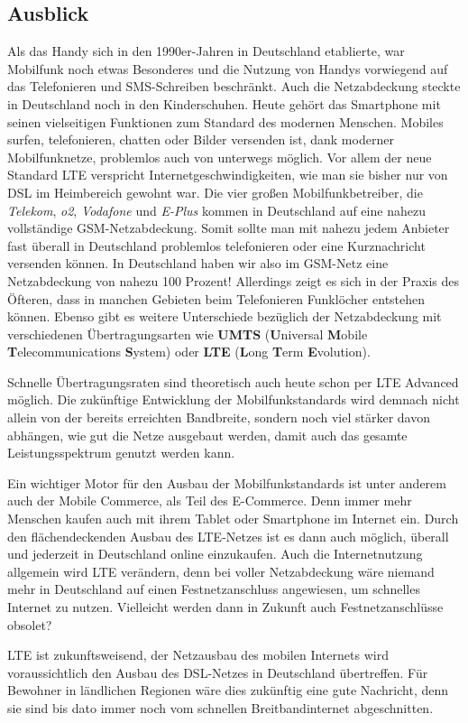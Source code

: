 \begin{multicols}{3}
\subsection*{Ausblick}
Als das Handy sich in den 1990er-Jahren in Deutschland etablierte, war Mobilfunk noch etwas Besonderes und die Nutzung von Handys vorwiegend auf das Telefonieren und SMS-Schreiben beschränkt. Auch die Netzabdeckung steckte in Deutschland noch in den Kinderschuhen. Heute gehört das Smartphone mit seinen vielseitigen Funktionen zum Standard des modernen Menschen. Mobiles surfen, telefonieren, chatten oder Bilder versenden ist, dank moderner Mobilfunknetze, problemlos auch von unterwegs möglich. Vor allem der neue Standard LTE verspricht Internetgeschwindigkeiten, wie man sie bisher nur von DSL im Heimbereich gewohnt war.
Die vier großen Mobilfunkbetreiber, die \textit{Telekom}, \textit{o2}, \textit{Vodafone} und \textit{E-Plus} kommen in Deutschland auf eine nahezu vollständige GSM-Netzabdeckung. Somit sollte man mit nahezu jedem Anbieter fast überall in Deutschland problemlos telefonieren oder eine Kurznachricht versenden können. In Deutschland haben wir also im GSM-Netz eine Netzabdeckung von nahezu 100 Prozent! Allerdings zeigt es sich in der Praxis des Öfteren, dass in manchen Gebieten beim Telefonieren Funklöcher entstehen können. Ebenso gibt es weitere Unterschiede bezüglich der Netzabdeckung mit verschiedenen Übertragungsarten wie \textbf{UMTS} (\textbf{U}niversal \textbf{M}obile \textbf{T}elecommunications \textbf{S}ystem) oder \textbf{LTE} (\textbf{L}ong \textbf{T}erm \textbf{E}volution).

Schnelle Übertragungsraten sind theoretisch auch heute schon per LTE Advanced möglich. Die zukünftige Entwicklung der Mobilfunkstandards wird demnach nicht allein von der bereits erreichten Bandbreite, sondern noch viel stärker davon abhängen, wie gut die Netze ausgebaut werden, damit auch das gesamte Leistungsspektrum genutzt werden kann.

Ein wichtiger Motor für den Ausbau der Mobilfunkstandards ist unter anderem auch der Mobile Commerce, als Teil des E-Commerce. Denn immer mehr Menschen kaufen auch mit ihrem Tablet oder Smartphone im Internet ein. Durch den flächendeckenden Ausbau des LTE-Netzes ist es dann auch möglich, überall und jederzeit in Deutschland online einzukaufen. Auch die Internetnutzung allgemein wird LTE verändern, denn bei voller Netzabdeckung wäre niemand mehr in Deutschland auf einen Festnetzanschluss angewiesen, um schnelles Internet zu nutzen. Vielleicht werden dann in Zukunft auch Festnetzanschlüsse obsolet?

LTE ist zukunftsweisend, der Netzausbau des mobilen Internets wird voraussichtlich den Ausbau des DSL-Netzes in Deutschland übertreffen. Für Bewohner in ländlichen Regionen wäre dies zukünftig eine gute Nachricht, denn sie sind bis dato immer noch vom schnellen Breitbandinternet abgeschnitten.

\printbibliography[segment=5,heading=subbibliography]
\end{multicols}
\newpage
